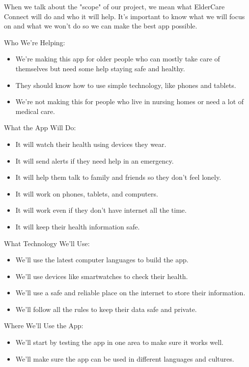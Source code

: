 \documentclass{article}
\begin{document}
When we talk about the "scope" of our project, we mean what ElderCare Connect will do and who it will help. It's important to know what we will focus on and what we won't do so we can make the best app possible.

Who We're Helping:

\begin{itemize}
    \item We're making this app for older people who can mostly take care of themselves but need some help staying safe and healthy.
    \item They should know how to use simple technology, like phones and tablets.
    \item We're not making this for people who live in nursing homes or need a lot of medical care.
\end{itemize}

What the App Will Do:

\begin{itemize}
    \item It will watch their health using devices they wear.
    \item It will send alerts if they need help in an emergency.
    \item It will help them talk to family and friends so they don't feel lonely.
    \item It will work on phones, tablets, and computers.
    \item It will work even if they don't have internet all the time.
    \item It will keep their health information safe.
\end{itemize}

What Technology We'll Use:

\begin{itemize}
    \item We'll use the latest computer languages to build the app.
    \item We'll use devices like smartwatches to check their health.
    \item We'll use a safe and reliable place on the internet to store their information.
    \item We'll follow all the rules to keep their data safe and private.
\end{itemize}

Where We'll Use the App:

\begin{itemize}
    \item We'll start by testing the app in one area to make sure it works well.
    \item We'll make sure the app can be used in different languages and cultures.
\end{itemize}
\end{document}
